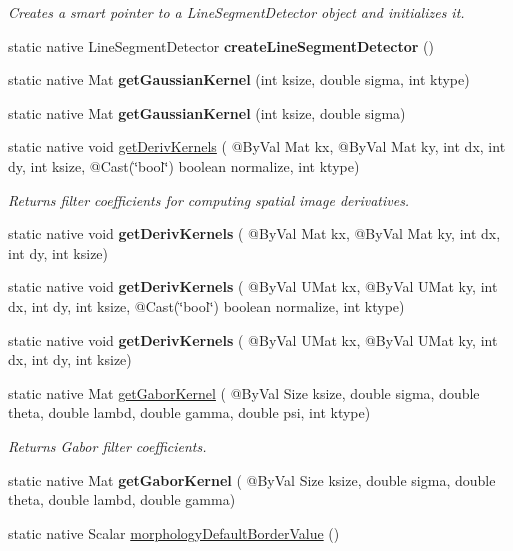 \begin{DoxyCompactItemize}
\begin{DoxyCompactList}\small\item\em Creates a smart pointer to a Line\+Segment\+Detector object and initializes it. \end{DoxyCompactList}\item 
static native Line\+Segment\+Detector {\bfseries create\+Line\+Segment\+Detector} ()
\item 
static native Mat {\bfseries get\+Gaussian\+Kernel} (int ksize, double sigma, int ktype)
\item 
static native Mat {\bfseries get\+Gaussian\+Kernel} (int ksize, double sigma)
\item 
static native void \hyperlink{group__imgproc__filter_ga6e163a3c7af7f53953629e3bc1a4d5ea}{get\+Deriv\+Kernels} ( @By\+Val Mat kx, @By\+Val Mat ky, int dx, int dy, int ksize, @Cast(\char`\"{}bool\char`\"{}) boolean normalize, int ktype)
\begin{DoxyCompactList}\small\item\em Returns filter coefficients for computing spatial image derivatives. \end{DoxyCompactList}\item 
static native void {\bfseries get\+Deriv\+Kernels} ( @By\+Val Mat kx, @By\+Val Mat ky, int dx, int dy, int ksize)
\item 
static native void {\bfseries get\+Deriv\+Kernels} ( @By\+Val U\+Mat kx, @By\+Val U\+Mat ky, int dx, int dy, int ksize, @Cast(\char`\"{}bool\char`\"{}) boolean normalize, int ktype)
\item 
static native void {\bfseries get\+Deriv\+Kernels} ( @By\+Val U\+Mat kx, @By\+Val U\+Mat ky, int dx, int dy, int ksize)
\item 
static native Mat \hyperlink{group__imgproc__filter_ga8c30992daccc2467cea3d7d2f016a9ab}{get\+Gabor\+Kernel} ( @By\+Val Size ksize, double sigma, double theta, double lambd, double gamma, double psi, int ktype)
\begin{DoxyCompactList}\small\item\em Returns Gabor filter coefficients. \end{DoxyCompactList}\item 
static native Mat {\bfseries get\+Gabor\+Kernel} ( @By\+Val Size ksize, double sigma, double theta, double lambd, double gamma)
\item 
static native Scalar \hyperlink{group__imgproc__filter_gaa77a7ec53d115ff76de4c8797d6d83f7}{morphology\+Default\+Border\+Value} ()
\item 

\end{DoxyCompactItemize}
